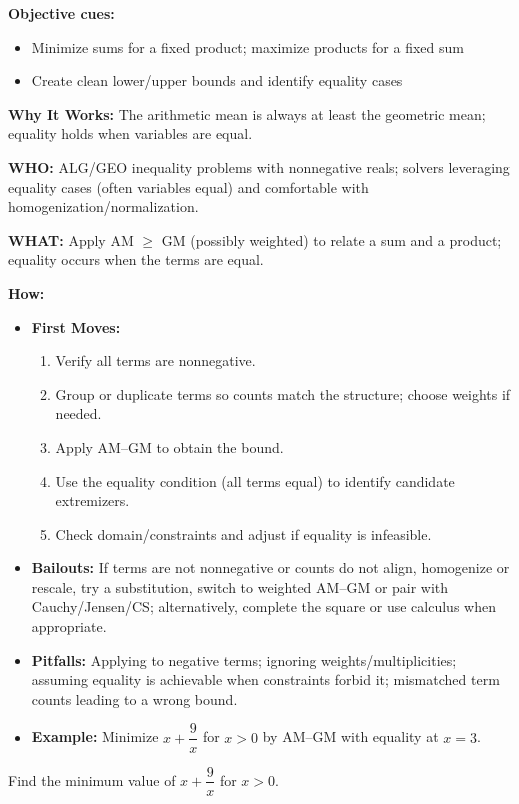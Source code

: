 \documentclass[12pt]{article}
\newenvironment{problem}[1]
{\begin{tcolorbox}[colback=blue!5!white,colframe=blue!75!black,title={#1}]}{\end{tcolorbox}}
\begin{document}
\textbf{Objective cues:}
\begin{itemize}
    \item Minimize sums for a fixed product; maximize products for a fixed sum
    \item Create clean lower/upper bounds and identify equality cases
\end{itemize}

\textbf{Why It Works:} The arithmetic mean is always at least the geometric mean; equality holds when variables are equal.

\textbf{WHO:} ALG/GEO inequality problems with nonnegative reals; solvers leveraging equality cases (often variables equal) and comfortable with homogenization/normalization.

\textbf{WHAT:} Apply AM $\ge$ GM (possibly weighted) to relate a sum and a product; equality occurs when the terms are equal.


\textbf{How:}
\begin{itemize}
    \item \textbf{First Moves:}
    \begin{enumerate}[nosep]
        \item Verify all terms are nonnegative.
        \item Group or duplicate terms so counts match the structure; choose weights if needed.
        \item Apply AM–GM to obtain the bound.
        \item Use the equality condition (all terms equal) to identify candidate extremizers.
        \item Check domain/constraints and adjust if equality is infeasible.
    \end{enumerate}
    \item \textbf{Bailouts:} If terms are not nonnegative or counts do not align, homogenize or rescale, try a substitution, switch to weighted AM–GM or pair with Cauchy/Jensen/CS; alternatively, complete the square or use calculus when appropriate.
    \item \textbf{Pitfalls:} Applying to negative terms; ignoring weights/multiplicities; assuming equality is achievable when constraints forbid it; mismatched term counts leading to a wrong bound.
    \item \textbf{Example:} Minimize $x+\dfrac{9}{x}$ for $x>0$ by AM–GM with equality at $x=3$.
\end{itemize}

\begin{problem}{Example: Minimize $x + \dfrac{9}{x}$}
Find the minimum value of $x + \dfrac{9}{x}$ for $x > 0$.
\end{problem}
\end{document}
